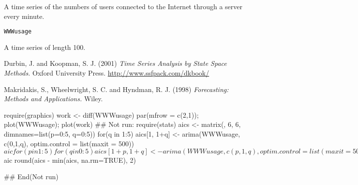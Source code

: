 %
\begin{Description}\relax
A time series of the numbers of users connected to the Internet
through a server every minute.
\end{Description}
%
\begin{Usage}
\begin{verbatim}
WWWusage
\end{verbatim}
\end{Usage}
%
\begin{Format}
A time series of length 100.
\end{Format}
%
\begin{Source}\relax
Durbin, J. and Koopman, S. J. (2001) \emph{Time Series Analysis by
State Space Methods.}  Oxford University Press.
\url{http://www.ssfpack.com/dkbook/} 
\end{Source}
%
\begin{References}\relax
Makridakis, S., Wheelwright, S. C. and Hyndman, R. J. (1998)
\emph{Forecasting: Methods and Applications.} Wiley.
\end{References}
%
\begin{Examples}
\begin{ExampleCode}
require(graphics)
work <- diff(WWWusage)
par(mfrow = c(2,1)); plot(WWWusage); plot(work)
## Not run: 
require(stats)
aics <- matrix(, 6, 6, dimnames=list(p=0:5, q=0:5))
for(q in 1:5) aics[1, 1+q] <- arima(WWWusage, c(0,1,q),
    optim.control = list(maxit = 500))$aic
for(p in 1:5)
   for(q in 0:5) aics[1+p, 1+q] <- arima(WWWusage, c(p,1,q),
       optim.control = list(maxit = 500))$aic
round(aics - min(aics, na.rm=TRUE), 2)

## End(Not run)
\end{ExampleCode}
\end{Examples}
\clearpage
